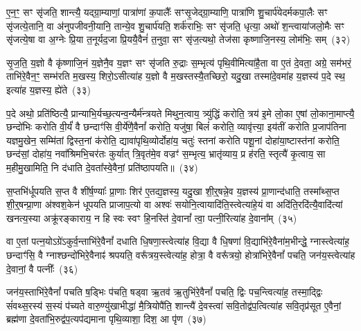 ए॒न॒ꣳ॒ सꣳ सृ॑जति॒ शान्त्यै॒ यद्ग्रा॒म्याणां॒ पात्रा॑णां क॒पालैः᳚ सꣳसृ॒जेद्ग्रा॒म्याणि॒ पात्रा॑णि शु॒चार्प॑येदर्मकपा॒लैः सꣳ सृ॑जत्ये॒तानि॒ वा अ॑नुपजीवनी॒यानि॒ तान्ये॒व शु॒चार्प॑यति॒ शर्क॑राभिः॒ सꣳ सृ॑जति॒ धृत्या॒ अथो॑ श॒न्त्वाया॑जलो॒मैः सꣳ सृ॑जत्ये॒षा वा अ॒ग्नेः प्रि॒या त॒नूर्यद॒जा प्रि॒ययै॒वैनं॑ त॒नुवा॒ सꣳ सृ॑ज॒त्यथो॒ तेज॑सा कृष्णाजि॒नस्य॒ लोम॑भिः॒ सम्~(३२)

सृ॒ज॒ति॒ य॒ज्ञो वै कृ॑ष्णाजि॒नं य॒ज्ञेनै॒व य॒ज्ञꣳ सꣳ सृ॑जति रु॒द्राः स॒म्भृत्य॑ पृथि॒वीमित्या॑है॒ता वा ए॒तं दे॒वता॒ अग्रे॒ सम॑भरं॒ ताभि॑रे॒वैन॒ꣳ॒ सम्भ॑रति म॒खस्य॒ शिरो॒\-ऽसीत्या॑ह य॒ज्ञो वै म॒खस्तस्यै॒तच्छिरो॒ यदु॒खा तस्मा॑दे॒वमा॑ह य॒ज्ञस्य॑ प॒दे स्थ॒ इत्या॑ह य॒ज्ञस्य॒ ह्ये॑ते~(३३)

प॒दे अथो॒ प्रति॑ष्ठित्यै॒ प्रान्याभि॒र्यच्छ॒त्यन्व॒न्यैर्म॑न्त्रयते मिथुन॒त्वाय॒ त्र्यु॑द्धिं करोति॒ त्रय॑ इ॒मे लो॒का ए॒षां लो॒काना॒माप्त्यै॒ छन्दो॑भिः करोति वी॒र्यं॑ वै छन्दाꣳ॑सि वी॒र्ये॑णै॒वैनां᳚ करोति॒ यजु॑षा॒ बिलं॑ करोति॒ व्यावृ॑त्त्या॒ इय॑तीं करोति प्र॒जा\-प॑तिना यज्ञमु॒खेन॒ सम्मि॑तां द्विस्त॒नां क॑रोति॒ द्यावा॑पृथि॒व्योर्दोहा॑य॒ चतुः॑ स्तनां करोति पशू॒नां दोहा॑या॒ष्टास्त॑नां करोति॒ छन्द॑सां॒ दोहा॑य॒ नवा᳚श्रिमभि॒चर॑तः कुर्यात् त्रि॒वृत॑मे॒व वज्रꣳ॑ स॒म्भृत्य॒ भ्रातृ॑व्याय॒ प्र ह॑रति॒ स्तृत्यै॑ कृ॒त्वाय॒ सा म॒हीमु॒खामिति॒ नि द॑धाति दे॒वता᳚स्वे॒वैनां॒ प्रति॑\-ष्ठापयति॥~(३४)

{\anuvakamend[{तेनै॒व लोम॑भिः॒ समे॒ते अ॑भि॒चर॑त॒ एक॑विꣳशतिश्च}]}%

स॒प्तभि॑र्धूपयति स॒प्त वै शी॑र्\mbox{}ष॒ण्याः᳚ प्रा॒णाः शिर॑ ए॒तद्य॒ज्ञस्य॒ यदु॒खा शी॒र्॒\mbox{}षन्ने॒व य॒ज्ञस्य॑ प्रा॒णान्द॑धाति॒ तस्मा᳚थ्स॒प्त शी॒र्॒\mbox{}षन्प्रा॒णा अ॑श्वश॒केन॑ धूपयति प्राजाप॒त्यो वा अश्वः॑ सयोनि॒त्वायादि॑ति॒स्त्वेत्या॑हे॒यं वा अदि॑ति॒रदि॑त्यै॒वादि॑त्यां खनत्य॒स्या अक्रू॑रङ्काराय॒ न हि स्वः स्वꣳ हि॒नस्ति॑ दे॒वानां᳚ त्वा॒ पत्नी॒रित्या॑ह दे॒वाना᳚म्~(३५)

वा ए॒तां पत्न॒यो\-ऽग्रे॑\-ऽकुर्व॒न्ताभि॑रे॒वैनां᳚ दधाति धि॒षणा॒स्त्वेत्या॑ह वि॒द्या वै धि॒षणा॑ वि॒द्याभि॑रे॒वैना॑म॒भीन्द्धे॒ ग्नास्त्वेत्या॑ह॒ छन्दाꣳ॑सि॒ वै ग्नाश्छन्दो॑भिरे॒वैनाꣴ॑ श्रपयति॒ वरू᳚त्रय॒स्त्वेत्या॑ह॒ होत्रा॒ वै वरू᳚त्रयो॒ होत्रा॑भिरे॒वैनां᳚ पचति॒ जन॑य॒स्त्वेत्या॑ह दे॒वानां॒ वै पत्नीः᳚~(३६)

जन॑य॒स्ताभि॑रे॒वैनां᳚ पचति ष॒ड्भिः प॑चति॒ षड्वा ऋ॒तव॑ ऋ॒तुभि॑रे॒वैनां᳚ पचति॒ द्विः पच॒न्त्वित्या॑ह॒ तस्मा॒द्द्विः सं॑वथ्स॒रस्य॑ स॒स्यं प॑च्यते वारु॒ण्यु॑खाभीद्धा॑ मै॒त्रियोपै॑ति॒ शान्त्यै॑ दे॒वस्त्वा॑ सवि॒तोद्व॑प॒त्वित्या॑ह सवि॒तृप्र॑सूत ए॒वैनां॒ ब्रह्म॑णा दे॒वता॑भि॒रुद्व॑प॒त्यप॑द्यमाना पृथि॒व्याशा॒ दिश॒ आ पृ॑ण~(३७)

